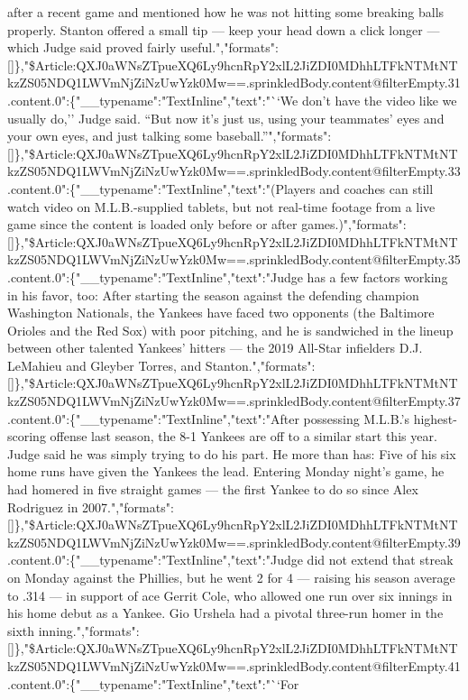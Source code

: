 after a recent game and mentioned how he was not hitting some breaking
balls properly. Stanton offered a small tip --- keep your head down a
click longer --- which Judge said proved fairly
useful.","formats":{[}{]}\},"\$Article:QXJ0aWNsZTpueXQ6Ly9hcnRpY2xlL2JiZDI0MDhhLTFkNTMtNTkzZS05NDQ1LWVmNjZiNzUwYzk0Mw==.sprinkledBody.content@filterEmpty.31.content.0":\{"\_\_typename":"TextInline","text":"``We
don't have the video like we usually do,'' Judge said. ``But now it's
just us, using your teammates' eyes and your own eyes, and just talking
some
baseball.''","formats":{[}{]}\},"\$Article:QXJ0aWNsZTpueXQ6Ly9hcnRpY2xlL2JiZDI0MDhhLTFkNTMtNTkzZS05NDQ1LWVmNjZiNzUwYzk0Mw==.sprinkledBody.content@filterEmpty.33.content.0":\{"\_\_typename":"TextInline","text":"(Players
and coaches can still watch video on M.L.B.-supplied tablets, but not
real-time footage from a live game since the content is loaded only
before or after
games.)","formats":{[}{]}\},"\$Article:QXJ0aWNsZTpueXQ6Ly9hcnRpY2xlL2JiZDI0MDhhLTFkNTMtNTkzZS05NDQ1LWVmNjZiNzUwYzk0Mw==.sprinkledBody.content@filterEmpty.35.content.0":\{"\_\_typename":"TextInline","text":"Judge
has a few factors working in his favor, too: After starting the season
against the defending champion Washington Nationals, the Yankees have
faced two opponents (the Baltimore Orioles and the Red Sox) with poor
pitching, and he is sandwiched in the lineup between other talented
Yankees' hitters --- the 2019 All-Star infielders D.J. LeMahieu and
Gleyber Torres, and
Stanton.","formats":{[}{]}\},"\$Article:QXJ0aWNsZTpueXQ6Ly9hcnRpY2xlL2JiZDI0MDhhLTFkNTMtNTkzZS05NDQ1LWVmNjZiNzUwYzk0Mw==.sprinkledBody.content@filterEmpty.37.content.0":\{"\_\_typename":"TextInline","text":"After
possessing M.L.B.'s highest-scoring offense last season, the 8-1 Yankees
are off to a similar start this year. Judge said he was simply trying to
do his part. He more than has: Five of his six home runs have given the
Yankees the lead. Entering Monday night's game, he had homered in five
straight games --- the first Yankee to do so since Alex Rodriguez in
2007.","formats":{[}{]}\},"\$Article:QXJ0aWNsZTpueXQ6Ly9hcnRpY2xlL2JiZDI0MDhhLTFkNTMtNTkzZS05NDQ1LWVmNjZiNzUwYzk0Mw==.sprinkledBody.content@filterEmpty.39.content.0":\{"\_\_typename":"TextInline","text":"Judge
did not extend that streak on Monday against the Phillies, but he went 2
for 4 --- raising his season average to .314 --- in support of ace
Gerrit Cole, who allowed one run over six innings in his home debut as a
Yankee. Gio Urshela had a pivotal three-run homer in the sixth
inning.","formats":{[}{]}\},"\$Article:QXJ0aWNsZTpueXQ6Ly9hcnRpY2xlL2JiZDI0MDhhLTFkNTMtNTkzZS05NDQ1LWVmNjZiNzUwYzk0Mw==.sprinkledBody.content@filterEmpty.41.content.0":\{"\_\_typename":"TextInline","text":"``For

